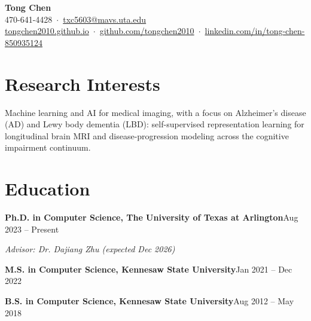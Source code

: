 \documentclass[11pt]{article}
\newcommand{\dated}[2]{\textbf{#1}\hfill #2\par}
\begin{document}
\begin{center}
  {\LARGE\textbf{Tong Chen}}\\[4pt]
  470-641-4428 \,$\cdot$\, \href{mailto:txc5603@mavs.uta.edu}{txc5603@mavs.uta.edu}\\[2pt]
  \href{https://tongchen2010.github.io}{tongchen2010.github.io} \,$\cdot$\,
  \href{https://github.com/tongchen2010}{github.com/tongchen2010} \,$\cdot$\,
  \href{https://www.linkedin.com/in/tong-chen-850935124}{linkedin.com/in/tong-chen-850935124}
\end{center}

\section{Research Interests}
Machine learning and AI for medical imaging, with a focus on Alzheimer's disease (AD) and
Lewy body dementia (LBD): self-supervised representation learning for longitudinal brain MRI
and disease-progression modeling across the cognitive impairment continuum.

\section{Education}
\dated{Ph.D. in Computer Science, The University of Texas at Arlington}{Aug 2023 -- Present}
\textit{Advisor: Dr. Dajiang Zhu \quad (expected Dec 2026)}\par
\vspace{2pt}
\dated{M.S. in Computer Science, Kennesaw State University}{Jan 2021 -- Dec 2022}
\vspace{2pt}
\dated{B.S. in Computer Science, Kennesaw State University}{Aug 2012 -- May 2018}

\end{document}
